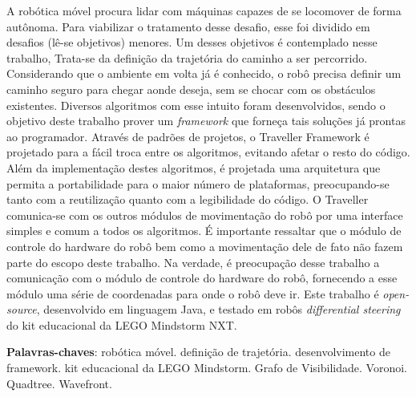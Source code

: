 \begin{resumo}
A robótica móvel procura lidar com máquinas capazes de se locomover de forma autônoma. Para viabilizar o tratamento desse desafio, esse foi dividido em desafios (lê-se objetivos) menores. Um desses objetivos é contemplado nesse trabalho, Trata-se da definição da trajetória do caminho a ser percorrido. Considerando que o ambiente em volta já é conhecido, o robô precisa definir um caminho seguro para chegar aonde deseja, sem se chocar com os obstáculos existentes. Diversos algoritmos com esse intuito foram desenvolvidos, sendo o objetivo deste trabalho prover um \textit{framework} que forneça tais soluções já prontas ao programador. Através de padrões de projetos, o Traveller Framework é projetado para a fácil troca entre os algoritmos, evitando afetar o resto do código. Além da implementação destes algoritmos, é projetada uma arquitetura que permita a portabilidade para o maior número de plataformas, preocupando-se tanto com a reutilização quanto com a legibilidade do código. O Traveller comunica-se com os outros módulos de movimentação do robô por uma interface simples e comum a todos os algoritmos. É importante ressaltar que o módulo de controle do hardware do robô bem como a movimentação dele de fato não fazem parte do escopo deste trabalho. Na verdade, é preocupação desse trabalho a comunicação com o módulo de controle do hardware do robô, fornecendo a esse módulo uma série de coordenadas para onde o robô deve ir. Este trabalho é \textit{open-source}, desenvolvido em linguagem Java, e testado em robôs \textit{differential steering} do kit educacional da LEGO Mindstorm NXT.

 \vspace{\onelineskip}
    
 \noindent
 \textbf{Palavras-chaves}: robótica móvel. definição de trajetória. desenvolvimento de framework. kit educacional da LEGO Mindstorm. Grafo de Visibilidade. Voronoi. Quadtree. Wavefront.
\end{resumo}
